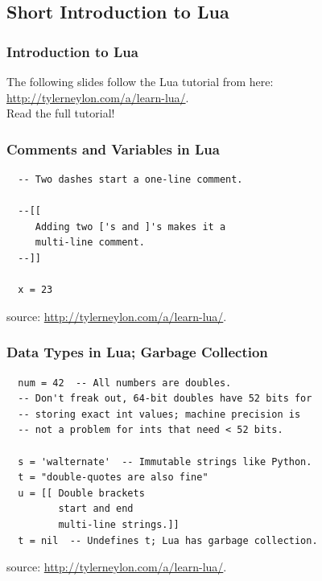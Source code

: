 \subsection{Short Introduction to Lua}
\label{sec:intro_to_torch}

\begin{frame}
  \frametitle{Introduction to Lua}
  \begin{center}
    The following slides follow the Lua tutorial from here:
    \url{http://tylerneylon.com/a/learn-lua/}. \\
    \vfill
    Read the full tutorial!
  \end{center}
\end{frame}

\begin{frame}[fragile]
  \frametitle{Comments and Variables in Lua}
  \begin{verbatim}
  -- Two dashes start a one-line comment.

  --[[
     Adding two ['s and ]'s makes it a
     multi-line comment.
  --]]

  x = 23
  \end{verbatim}
  \begin{center}
    \begin{tiny}
      source: \url{http://tylerneylon.com/a/learn-lua/}.
    \end{tiny}
  \end{center}
\end{frame}

\begin{frame}[fragile]
  \frametitle{Data Types in Lua; Garbage Collection}
  \begin{verbatim}
  num = 42  -- All numbers are doubles.
  -- Don't freak out, 64-bit doubles have 52 bits for
  -- storing exact int values; machine precision is
  -- not a problem for ints that need < 52 bits.

  s = 'walternate'  -- Immutable strings like Python.
  t = "double-quotes are also fine"
  u = [[ Double brackets
         start and end
         multi-line strings.]]
  t = nil  -- Undefines t; Lua has garbage collection.
  \end{verbatim}
  \begin{center}
    \begin{tiny}
      source: \url{http://tylerneylon.com/a/learn-lua/}.
    \end{tiny}
  \end{center}
\end{frame}

